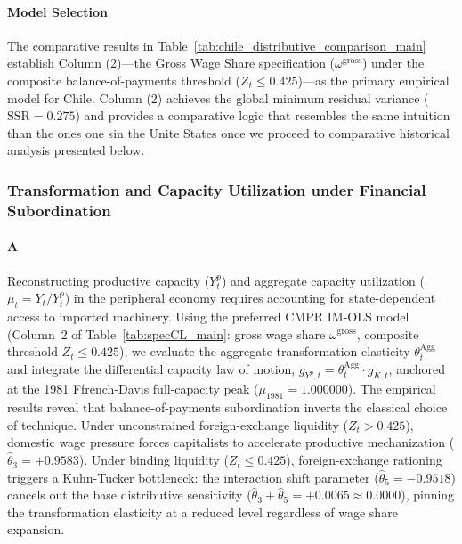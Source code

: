 \paragraph{Model Selection} The comparative results in Table~\ref{tab:chile_distributive_comparison_main} establish Column (2)—the Gross Wage Share specification ($\omega^{\text{gross}}$) under the composite balance-of-payments threshold ($Z_t \le 0.425$)—as the primary empirical model for Chile. Column (2) achieves the global minimum residual variance ($\text{SSR} = 0.275$) and provides a comparative logic that resembles the same  intuition than the ones one sin the Unite States once we proceed to comparative historical analysis presented below.  




\subsubsection{Transformation and Capacity Utilization under Financial Subordination}
\label{sec:443:chile_utilization}

\paragraph{A} Reconstructing productive capacity ($Y_t^p$) and aggregate capacity utilization ($\mu_t = Y_t / Y_t^p$) in the peripheral economy requires accounting for state-dependent access to imported machinery. Using the preferred CMPR IM-OLS model (Column~2 of Table~\ref{tab:specCL_main}: gross wage share $\omega^{\text{gross}}$, composite threshold $Z_t \le 0.425$), we evaluate the aggregate transformation elasticity $\theta_t^{\text{Agg}}$ and integrate the differential capacity law of motion, $g_{Y^p,t} = \theta_t^{\text{Agg}} \cdot g_{K,t}$, anchored at the 1981 Ffrench-Davis full-capacity peak ($\mu_{1981} = 1.000000$). The empirical results reveal that balance-of-payments subordination inverts the classical choice of technique. Under unconstrained foreign-exchange liquidity ($Z_t > 0.425$), domestic wage pressure forces capitalists to accelerate productive mechanization ($\hat{\theta}_3 = +0.9583$). Under binding liquidity ($Z_t \le 0.425$), foreign-exchange rationing triggers a Kuhn-Tucker bottleneck: the interaction shift parameter ($\hat{\theta}_5 = -0.9518$) cancels out the base distributive sensitivity ($\hat{\theta}_3 + \hat{\theta}_5 = +0.0065 \approx 0.0000$), pinning the transformation elasticity at a reduced level regardless of wage share expansion.

